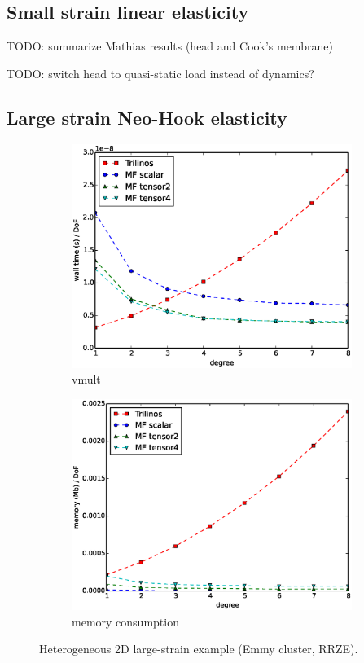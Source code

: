 \documentclass[preprint,12pt,times]{elsarticle}
\begin{document}
\subsection{Small strain linear elasticity}

TODO: summarize Mathias results (head and Cook's membrane)

TODO: switch head to quasi-static load instead of dynamics?

\subsection{Large strain Neo-Hook elasticity}

\begin{figure}[!ht]
  \centering
  \begin{subfigure}[b]{0.49\textwidth}
      \centering
      \includegraphics[width=\textwidth]{Emmy_RRZE_timing.eps}
      \caption{vmult}
  \end{subfigure}
  \begin{subfigure}[b]{0.49\textwidth}
      \centering
      \includegraphics[width=\textwidth]{Emmy_RRZE_memory.eps}
      \caption{memory consumption}
  \end{subfigure}
  \caption{Heterogeneous 2D large-strain example (Emmy cluster, RRZE).}%
  \label{fig:benchmark_2d_miehe}
\end{figure}
\end{document}
